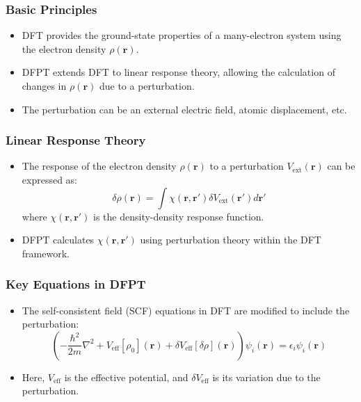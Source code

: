 \documentclass{CustomBeamer}
\begin{document}
    \begin{frame}
    \frametitle{Basic Principles}
    \begin{itemize}
        \item DFT provides the ground-state properties of a many-electron system using the electron density $\rho(\mathbf{r})$.
        \item DFPT extends DFT to linear response theory, allowing the calculation of changes in $\rho(\mathbf{r})$ due to a perturbation.
        \item The perturbation can be an external electric field, atomic displacement, etc.
    \end{itemize}
    \end{frame}
    
    \begin{frame}
    \frametitle{Linear Response Theory}
    \begin{itemize}
        \item The response of the electron density $\rho(\mathbf{r})$ to a perturbation $V_{\text{ext}}(\mathbf{r})$ can be expressed as:
        \begin{equation}
        \delta \rho(\mathbf{r}) = \int \chi(\mathbf{r}, \mathbf{r}') \delta V_{\text{ext}}(\mathbf{r}') d\mathbf{r}'
        \end{equation}
        where $\chi(\mathbf{r}, \mathbf{r}')$ is the density-density response function.
        \item DFPT calculates $\chi(\mathbf{r}, \mathbf{r}')$ using perturbation theory within the DFT framework.
    \end{itemize}
    \end{frame}
    
    \begin{frame}
    \frametitle{Key Equations in DFPT}
    \begin{itemize}
        \item The self-consistent field (SCF) equations in DFT are modified to include the perturbation:
        \begin{equation}
        \left( -\frac{\hbar^2}{2m} \nabla^2 + V_{\text{eff}}[\rho_0](\mathbf{r}) + \delta V_{\text{eff}}[\delta \rho](\mathbf{r}) \right) \psi_i(\mathbf{r}) = \epsilon_i \psi_i(\mathbf{r})
        \end{equation}
        \item Here, $V_{\text{eff}}$ is the effective potential, and $\delta V_{\text{eff}}$ is its variation due to the perturbation.
    \end{itemize}
    \end{frame}
    
\end{document}
